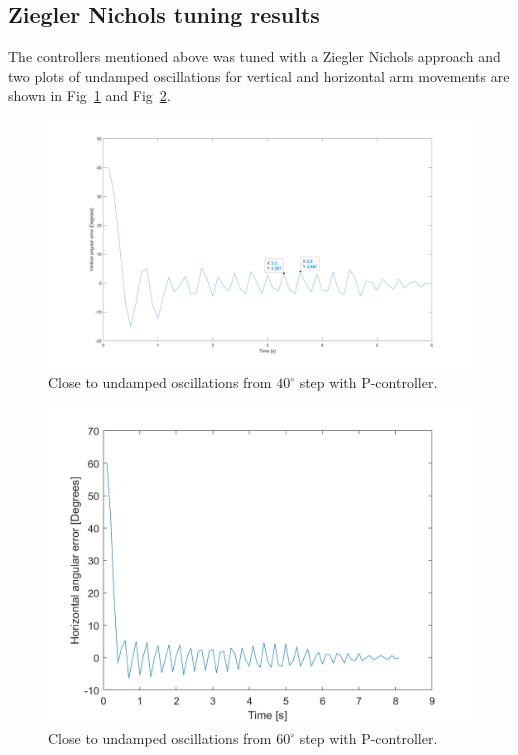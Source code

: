 \subsection{Ziegler Nichols tuning results}
The controllers mentioned above was tuned with a Ziegler Nichols approach and two plots of undamped oscillations for vertical and horizontal arm movements are shown in  Fig~\ref{vert_osc} and Fig~\ref{Hor_osc}.
\begin{figure}[H]
\centering
\includegraphics[width=\textwidth]{assets/Vertical_undamped_oscillation.png}
\caption{Close to undamped oscillations from \(40^{\circ}\) step with P-controller.}
\label{vert_osc}
\end{figure}
\begin{figure}[H]
\centering
\includegraphics[width=\textwidth]{assets/Horizontal_undamped_oscillation.png}
\caption{Close to undamped oscillations from \(60^{\circ}\) step with P-controller.}
\label{Hor_osc}
\end{figure}
